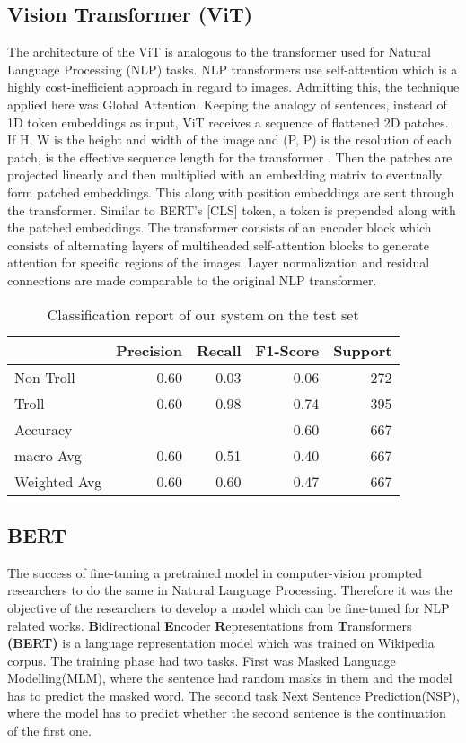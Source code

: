 \documentclass[11pt,a4paper]{article}
\begin{document}
\subsection{Vision Transformer (ViT)}
\label{ViT}
The architecture of the ViT is analogous to the transformer used for Natural Language Processing (NLP) tasks. NLP transformers use self-attention which is a highly cost-inefficient approach in regard to images. Admitting this, the technique applied here was Global Attention. Keeping the analogy of sentences, instead of 1D token embeddings as input, ViT receives a sequence of flattened 2D patches. If H, W is the height and width of the image and (P, P) is the resolution of each patch,  is the effective sequence length for the transformer \cite{dosovitskiy2021an}. Then the patches are projected linearly and then multiplied with an embedding matrix to eventually form patched embeddings. This along with position embeddings are sent through the transformer. Similar to BERT's [CLS] token, a token is prepended along with the patched embeddings. The transformer consists of an encoder block which consists of alternating layers of multiheaded self-attention blocks to generate attention for specific regions of the images. Layer normalization and residual connections are made comparable to the original NLP transformer.

\begin{table*}[!h]
\centering
\begin{tabular}{l|r|r|r|r}
\hline
 & Precision & Recall & F1-Score & Support\\
\hline
Non-Troll & 0.60 & 0.03 & 0.06 & 272\\
Troll & 0.60 & 0.98 & 0.74 & 395\\ 
\hline 
Accuracy & & & 0.60 & 667\\
macro Avg & 0.60 & 0.51 & 0.40 & 667 \\
Weighted Avg & 0.60 & 0.60 & 0.47 & 667\\
\hline
\end{tabular}
\caption{Classification report of our system on the test set}\label{tab4}
\end{table*}
\subsection{BERT}
\label{bert}
The success of fine-tuning a pretrained model in computer-vision prompted researchers to do the same in Natural Language Processing. Therefore it was the objective of the researchers to develop a model which can be fine-tuned for NLP related works. \textbf{B}idirectional \textbf{E}ncoder \textbf{R}epresentations from \textbf{T}ransformers \textbf{(BERT)} \cite{devlin-etal-2019-bert} is a language representation model which was trained on Wikipedia corpus. The training phase had two tasks. First was Masked Language Modelling(MLM), where the sentence had random masks in them and the model has to predict the masked word. The second task Next Sentence Prediction(NSP), where the model has to predict whether the second sentence is the continuation of the first one. 
\end{document}

